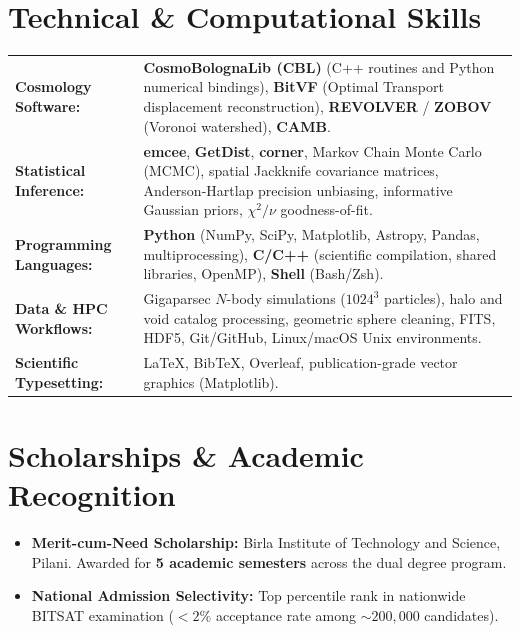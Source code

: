 \documentclass[10pt,a4paper]{article}
\begin{document}
\section{Technical \& Computational Skills}

\begin{tabularx}{\textwidth}{@{}p{3.8cm}X@{}}
    \textbf{Cosmology Software:} & \textbf{CosmoBolognaLib (CBL)} (C++ routines and Python numerical bindings), \textbf{BitVF} (Optimal Transport displacement reconstruction), \textbf{REVOLVER} / \textbf{ZOBOV} (Voronoi watershed), \textbf{CAMB}. \\
    \textbf{Statistical Inference:} & \textbf{emcee}, \textbf{GetDist}, \textbf{corner}, Markov Chain Monte Carlo (MCMC), spatial Jackknife covariance matrices, Anderson-Hartlap precision unbiasing, informative Gaussian priors, $\chi^2/\nu$ goodness-of-fit. \\
    \textbf{Programming Languages:} & \textbf{Python} (NumPy, SciPy, Matplotlib, Astropy, Pandas, multiprocessing), \textbf{C/C++} (scientific compilation, shared libraries, OpenMP), \textbf{Shell} (Bash/Zsh). \\
    \textbf{Data \& HPC Workflows:} & Gigaparsec $N$-body simulations ($1024^3$ particles), halo and void catalog processing, geometric sphere cleaning, FITS, HDF5, Git/GitHub, Linux/macOS Unix environments. \\
    \textbf{Scientific Typesetting:} & \LaTeX, Bib\TeX, Overleaf, publication-grade vector graphics (Matplotlib).
\end{tabularx}

\section{Scholarships \& Academic Recognition}

\begin{itemize}
    \item \textbf{Merit-cum-Need Scholarship:} Birla Institute of Technology and Science, Pilani. Awarded for \textbf{5 academic semesters} across the dual degree program.
    \item \textbf{National Admission Selectivity:} Top percentile rank in nationwide BITSAT examination ($<2\%$ acceptance rate among $\sim 200{,}000$ candidates).
\end{itemize}
\end{document}

